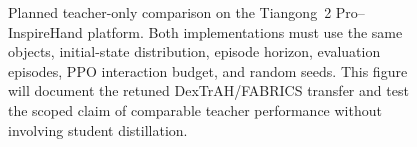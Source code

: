 \begin{figure}[H]
  \centering
  \caption{Planned teacher-only comparison on the Tiangong~2 Pro--InspireHand
  platform. Both implementations must use the same objects, initial-state
  distribution, episode horizon, evaluation episodes, PPO interaction budget,
  and random seeds. This figure will document the retuned DexTrAH/FABRICS
  transfer and test the scoped claim of comparable teacher performance without
  involving student distillation.}
  \label{fig:teacher_recipe_comparison}
\end{figure}
